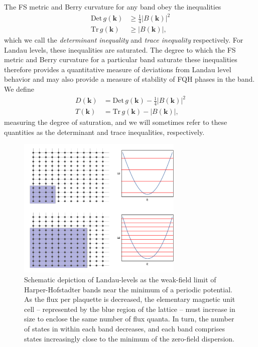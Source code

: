 \documentclass[aps,prb,twocolumn,letterpaper,twoside,nobalancelastpage,groupedaddress,amsmath,amssymb,floatfix,citeautoscript]{revtex4-1}
\begin{document}
The FS metric and Berry curvature for any band obey the inequalities\cite{roy_band_2014}
\begin{align}
\label{berry-metric-inequalities}
\text{Det}\,g(\mathbf{k})&\geq\frac{1}{4}|B(\mathbf{k})|^2\nonumber\\
\text{Tr}\,g(\mathbf{k})&\geq|B(\mathbf{k})|,
\end{align}
which we call the \textit{determinant inequality} and \textit{trace inequality} respectively. For Landau levels, these inequalities are saturated. The degree to which the FS metric and Berry curvature for a particular band saturate these inequalities therefore provides a quantitative measure of deviations from Landau level behavior and may also provide a measure of stability of FQH phases in the band. We define
\begin{align}
\label{geometry-inequalities}
D(\mathbf{k}) &= \text{Det}\,g(\mathbf{k})-\frac{1}{4}|B(\mathbf{k})|^2\nonumber\\
T(\mathbf{k}) &=\text{Tr}\,g(\mathbf{k})-|B(\mathbf{k})|,
\end{align}
measuring the degree of saturation, and we will sometimes refer to these quantities as the determinant and trace inequalities, respectively.

\begin{figure}[thb]
\centering
\includegraphics[width=3.1in]{unit-cell-dispersion-grid.pdf}
\caption{\label{bands-schematic}Schematic depiction of Landau-levels as the weak-field limit of Harper-Hofstadter bands near the minimum of a periodic potential. As the flux per plaquette is decreased, the elementary magnetic unit cell -- represented by the blue region of the lattice -- must increase in size to enclose the same number of flux quanta. In turn, the number of states in within each band decreases, and each band comprises states increasingly close to the minimum of the zero-field dispersion.}
\end{figure}
\end{document}
